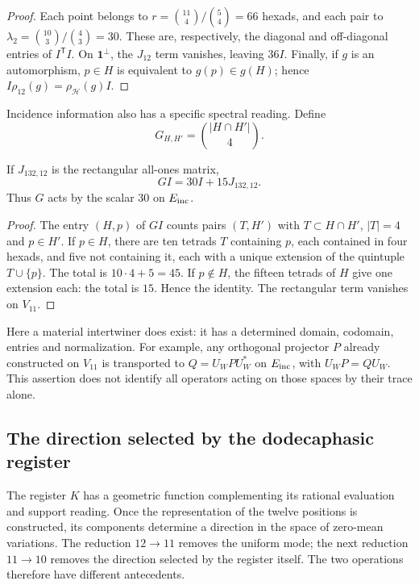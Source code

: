 \begin{proof}
Each point belongs to
$r=\binom{11}{4}/\binom54=66$ hexads, and each pair to
$\lambda_2=\binom{10}{3}/\binom43=30$. These are, respectively, the
diagonal and off-diagonal entries of $I^{\mathsf T}I$. On
$\mathbf1^\perp$, the $J_{12}$ term vanishes, leaving $36I$.
Finally, if $g$ is an automorphism, $p\in H$ is equivalent to
$g(p)\in g(H)$; hence $I\rho_{12}(g)=\rho_{\mathcal H}(g)I$.
\end{proof}

Incidence information also has a specific spectral
reading. Define
\[
 G_{H,H'}=\binom{|H\cap H'|}{4}.
\]

\begin{lemma}
\label{x_reciprocidad:exc:espectro}
If $J_{132,12}$ is the rectangular all-ones matrix,
\[
 GI=30I+15J_{132,12}.
\]
Thus $G$ acts by the scalar $30$ on $E_{\rm inc}$.
\end{lemma}

\begin{proof}
The entry $(H,p)$ of $GI$ counts pairs $(T,H')$ with
$T\subset H\cap H'$, $|T|=4$ and $p\in H'$. If $p\in H$, there are ten
tetrads $T$ containing $p$, each contained in four hexads,
and five not containing it, each with a unique extension of the
quintuple $T\cup\{p\}$. The total is $10\cdot4+5=45$.
If $p\notin H$, the fifteen tetrads of $H$ give one extension each:
the total is $15$. Hence the identity. The rectangular term
vanishes on $V_{11}$.
\end{proof}

Here a material intertwiner does exist: it has a determined domain, codomain,
entries and normalization. For example, any orthogonal
projector $P$ already constructed on $V_{11}$ is transported to
$Q=U_WPU_W^*$ on $E_{\rm inc}$, with
$U_WP=QU_W$. This assertion does not identify all operators
acting on those spaces by their trace alone.


\subsection{The direction selected by the dodecaphasic register}
\label{x_reciprocidad:exc:k-direccion}

The register \(K\) has a geometric function complementing its
rational evaluation and support reading. Once the representation
of the twelve positions is constructed, its components determine a
direction in the space of zero-mean variations. The reduction
\(12\to11\) removes the uniform mode; the next reduction
\(11\to10\) removes the direction selected by the register itself.
The two operations therefore have different antecedents.

